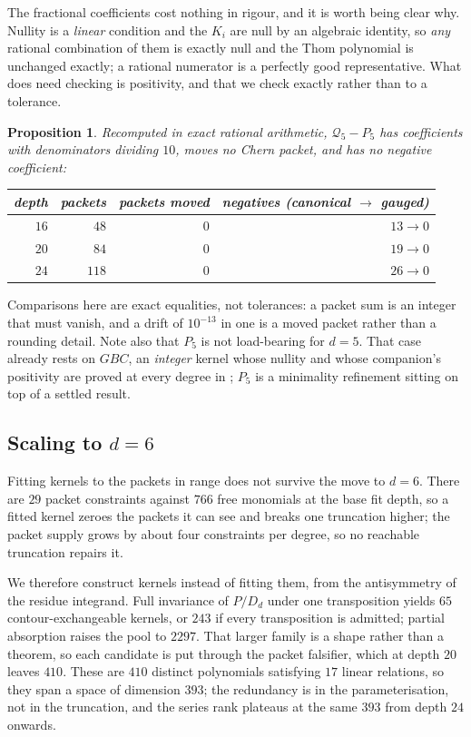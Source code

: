\documentclass[11pt,a4paper]{article}
\newcommand{\Qd}{\mathcal{Q}}
\theoremstyle{plain}
\newtheorem{proposition}{Proposition}
\theoremstyle{definition}
\theoremstyle{remark}
\begin{document}
The fractional coefficients cost nothing in rigour, and it is worth being clear why. Nullity is a
\emph{linear} condition and the $K_i$ are null by an algebraic identity, so \emph{any} rational
combination of them is exactly null and the Thom polynomial is unchanged exactly; a rational
numerator is a perfectly good representative. What does need checking is positivity, and that we
check exactly rather than to a tolerance.

\begin{proposition}
Recomputed in exact rational arithmetic, $\Qd_5 - P_5$ has coefficients with denominators
dividing $10$, moves no Chern packet, and has no negative coefficient:

\smallskip
\begin{tabular}{@{}rrrr@{}}
\toprule
depth & packets & packets moved & negatives (canonical $\to$ gauged) \\
\midrule
$16$ & $48$  & $0$ & $13 \to 0$ \\
$20$ & $84$  & $0$ & $19 \to 0$ \\
$24$ & $118$ & $0$ & $26 \to 0$ \\
\bottomrule
\end{tabular}
\end{proposition}

Comparisons here are exact equalities, not tolerances: a packet sum is an integer that must
vanish, and a drift of $10^{-13}$ in one is a moved packet rather than a rounding detail.
Note also that $P_5$ is not load-bearing for $d = 5$. That case already rests on $GBC$, an
\emph{integer} kernel whose nullity and whose companion's positivity are proved at every degree
in \cite{FS}; $P_5$ is a minimality refinement sitting on top of a settled result.

\subsection{Scaling to \texorpdfstring{$d = 6$}{d = 6}}

Fitting kernels to the packets in range does not survive the move to $d = 6$. There are $29$
packet constraints against $766$ free monomials at the base fit depth, so a fitted kernel
zeroes the packets it can see and breaks one truncation higher; the packet supply grows by
about four constraints per degree, so no reachable truncation repairs it.

We therefore construct kernels instead of fitting them, from the antisymmetry of the residue
integrand. Full invariance of $P/D_d$ under one transposition yields $65$ contour-exchangeable
kernels, or $243$ if every transposition is admitted; partial absorption raises the pool to
$2297$. That larger family is a shape rather than a theorem, so each candidate is put through
the packet falsifier, which at depth $20$ leaves $410$. These are $410$ distinct polynomials
satisfying $17$ linear relations, so they span a space of dimension $393$; the redundancy is in
the parameterisation, not in the truncation, and the series rank plateaus at the same $393$
from depth $24$ onwards.
\end{document}
